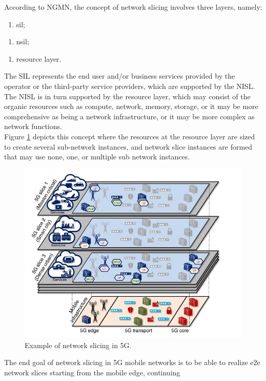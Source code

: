 \documentclass{report}
\begin{document}
According to NGMN, the concept of network slicing involves three layers,
namely:
\begin{enumerate}[1]
\item \gls{sil};
\end{enumerate}
\begin{enumerate}[2]
\item \gls{nsil};
\end{enumerate}
\begin{enumerate}[3]
\item resource layer.
\end{enumerate}
The SIL represents the end user and/or
business services provided by the operator or the third-party service providers,
which are supported by the NISL. The NISL
is in turn supported by the resource layer, which may consist of the organic
resources such as compute, network, memory, storage, or it may be more
comprehensive as being a network infrastructure, or it may be more complex
as network functions.\\
Figure \ref{layers} depicts this concept where the resources at
the resource layer are sized to create several sub-network instances,
and network slice instances are formed that may use none, one, or multiple sub
network instances.\\
\begin{figure}
\centering
\includegraphics[scale=0.65]{pics/1.JPG}
\caption{Example of network slicing in 5G.}
\label{layers}
\end{figure}The end goal of network slicing in 5G mobile networks is to be able to realize
\gls{e2e} network slices starting from the mobile edge, continuing
\end{document}

